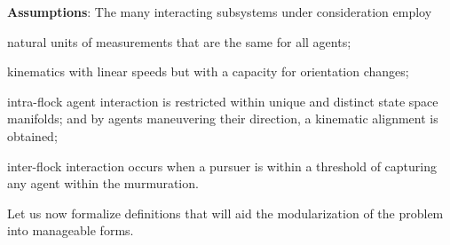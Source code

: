  \noindent \textbf{Assumptions}:
The many interacting subsystems under consideration employ
 \begin{inparaenum}[(i)]
 	\item natural units of measurements that are the same for all agents; 
 	\item kinematics with linear speeds but with a capacity for orientation changes;
 	\item intra-flock agent interaction is restricted within unique and distinct state space manifolds; and by agents maneuvering their direction, a kinematic alignment is obtained;
 	\item inter-flock interaction occurs when a pursuer is within a threshold of capturing any agent within the murmuration.
 \end{inparaenum} 

Let us now formalize definitions that will aid the modularization of the problem into manageable forms.
%

